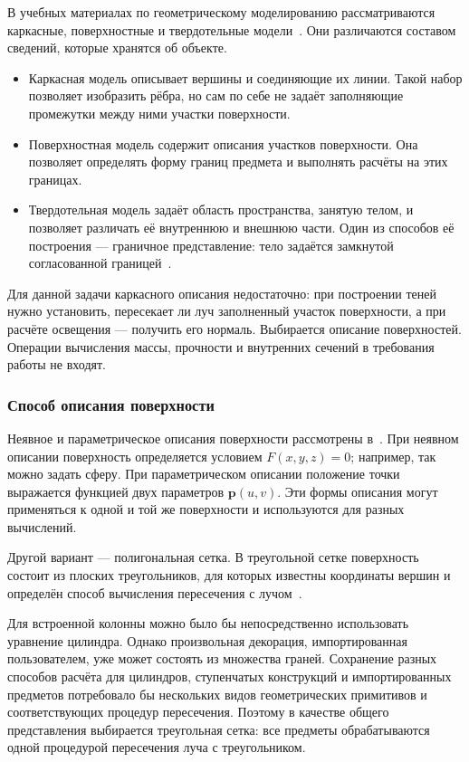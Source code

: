 В учебных материалах по геометрическому моделированию рассматриваются каркасные, поверхностные и твердотельные модели~\cite[разд.~1.2]{mit-geometric-modeling}. Они различаются составом сведений, которые хранятся об объекте.
\begin{itemize}[before=]
  \item Каркасная модель описывает вершины и соединяющие их линии. Такой набор позволяет изобразить рёбра, но сам по себе не задаёт заполняющие промежутки между ними участки поверхности.
  \item Поверхностная модель содержит описания участков поверхности. Она позволяет определять форму границ предмета и выполнять расчёты на этих границах.
  \item Твердотельная модель задаёт область пространства, занятую телом, и позволяет различать её внутреннюю и внешнюю части. Один из способов её построения --- граничное представление: тело задаётся замкнутой согласованной границей~\cite[разд.~1.2.3, 1.3.3]{mit-geometric-modeling}.
\end{itemize}

Для данной задачи каркасного описания недостаточно: при построении теней нужно установить, пересекает ли луч заполненный участок поверхности, а при расчёте освещения --- получить его нормаль. Выбирается описание поверхностей. Операции вычисления массы, прочности и внутренних сечений в требования работы не входят.

\subsubsection{Способ описания поверхности}

Неявное и параметрическое описания поверхности рассмотрены в~\cite[разд.~6.2]{pbrt4}. При неявном описании поверхность определяется условием $F(x,y,z)=0$; например, так можно задать сферу. При параметрическом описании положение точки выражается функцией двух параметров $\mathbf p(u,v)$. Эти формы описания могут применяться к одной и той же поверхности и используются для разных вычислений.

Другой вариант --- полигональная сетка. В треугольной сетке поверхность состоит из плоских треугольников, для которых известны координаты вершин и определён способ вычисления пересечения с лучом~\cite[разд.~6.5]{pbrt4}.

Для встроенной колонны можно было бы непосредственно использовать уравнение цилиндра. Однако произвольная декорация, импортированная пользователем, уже может состоять из множества граней. Сохранение разных способов расчёта для цилиндров, ступенчатых конструкций и импортированных предметов потребовало бы нескольких видов геометрических примитивов и соответствующих процедур пересечения. Поэтому в качестве общего представления выбирается треугольная сетка: все предметы обрабатываются одной процедурой пересечения луча с треугольником.

